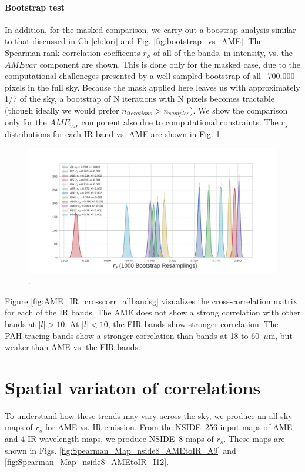         \paragraph{Bootstrap test}
            In addition, for the masked comparison, we carry out a boostrap analysis similar to that discussed in Ch \ref{ch:lori} and Fig. \ref{fig:bootstrap_vs_AME}. The Spearman rank correlation coefficents $r_{S}$ of all of the bands, in intensity, vs. the $AME{var}$ component are shown. This is done only for the masked case, due to the computational challeneges presented by a well-sampled bootstrap of all ~700,000 pixels in the full sky. Because the mask applied here leaves us with approximately 1/7 of the sky, a bootstrap of N iterations with N pixels becomes tractable (though ideally we would prefer $n_{iterations} > n_{samples}$). We show the comparison only for the $AME_{var}$ component also due to computational constraints. The $r_{s}$ distributions for each IR band vs. AME are shown in Fig. \ref{fig:bootstrap_vs_AME_allsky_masked}
            \begin{figure}
                 \includegraphics[width=\textwidth]{../Plots/ch_allsky/bootstrap_vs_AME_spearman_maskall_i1000.pdf}
                 \centering
                 \caption{.}
                 \label{fig:bootstrap_vs_AME_allsky_masked}
            \end{figure}



     Figure \ref{fig:AME_IR_crosscorr_allbandsg} visualizes the cross-correlation matrix for each of the IR bands. The AME does not show a strong correlation with other bands at $|l|>10$. At $|l|<10$, the FIR bands show stronger correlation. The PAH-tracing bands show a stronger correlation than bands at 18 to 60~$\mu$m, but weaker than AME vs. the FIR bands.

  \section{Spatial variaton of correlations}
    To understand how these trends may vary across the sky, we produce an all-sky maps of $r_{s}$ for AME vs. IR emission. From the NSIDE~256 input maps of AME and 4 IR wavelength maps, we produce NSIDE~8 maps of $r_{s}$. These maps are shown in Figs. \ref{fig:Spearman_Map_nside8_AMEtoIR_A9} and \ref{fig:Spearman_Map_nside8_AMEtoIR_I12}.




